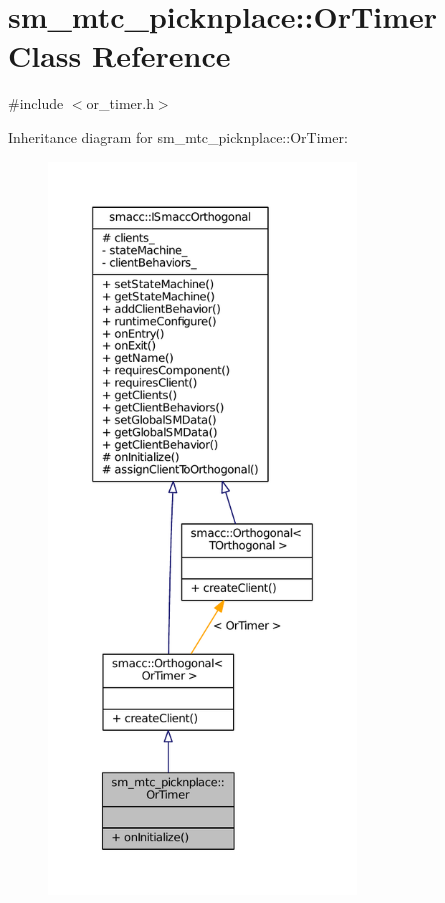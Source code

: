\hypertarget{classsm__mtc__picknplace_1_1OrTimer}{}\section{sm\+\_\+mtc\+\_\+picknplace\+:\+:Or\+Timer Class Reference}
\label{classsm__mtc__picknplace_1_1OrTimer}


{\ttfamily \#include $<$or\+\_\+timer.\+h$>$}



Inheritance diagram for sm\+\_\+mtc\+\_\+picknplace\+:\+:Or\+Timer\+:
\nopagebreak
\begin{figure}[H]
\begin{center}
\leavevmode
\includegraphics[height=550pt]{classsm__mtc__picknplace_1_1OrTimer__inherit__graph}
\end{center}
\end{figure}


